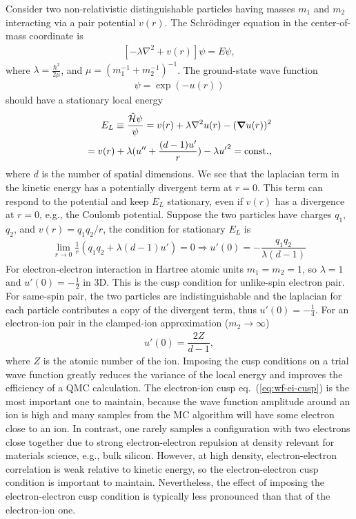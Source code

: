 Consider two non-relativistic distinguishable particles having masses $m_1$ and $m_2$ interacting via a pair potential $v(r)$. The Schr\"odinger equation in the center-of-mass coordinate is
\begin{align}
\left[-\lambda\nabla^2 + v(r)\right] \psi = E\psi,
\end{align}
where $\lambda=\frac{\hbar^2}{2\mu}$, and $\mu=(m_1^{-1}+m_2^{-1})^{-1}$. The ground-state wave function
\begin{align}
\psi = \exp(-u(r))
\end{align}
should have a stationary local energy
\begin{align} \label{eq:wf-cusp}
E_L \equiv \dfrac{\hat{\mathcal{H}}\psi}{\psi} = v(r) + \lambda\nabla^2u(r) - (\boldsymbol{\nabla}u(r))^2 \nonumber \\
= v(r) + \lambda (u''+\frac{(d-1)u'}{r}) - \lambda {u'}^2 = \text{const.},
\end{align}
where $d$ is the number of spatial dimensions.
We see that the laplacian term in the kinetic energy has a potentially divergent term at $r=0$.
This term can respond to the potential and keep $E_L$ stationary, even if $v(r)$ has a divergence at $r=0$, e.g., the Coulomb potential. Suppose the two particles have charges $q_1$, $q_2$, and $v(r)=q_1q_2/r$, the condition for stationary $E_L$ is
\begin{align}
\lim\limits_{r\rightarrow 0}\frac{1}{r} (q_1q_2+ \lambda (d-1) u')=0 \Rightarrow u'(0) = -\dfrac{q_1q_2}{\lambda (d-1)}
\end{align}
For electron-electron interaction in Hartree atomic units $m_1=m_2=1$, so $\lambda=1$ and $u'(0)=-\frac{1}{2}$ in 3D. This is the cusp condition for unlike-spin electron pair. For same-spin pair, the two particles are indistinguishable and the laplacian for each particle contributes a copy of the divergent term, thus $u'(0)=-\frac{1}{4}$. For an electron-ion pair in the clamped-ion approximation ($m_2\rightarrow\infty$)
\begin{align} \label{eq:wf-ei-cusp}
u'(0) = \dfrac{2Z}{d-1},
\end{align}
where $Z$ is the atomic number of the ion. Imposing the cusp conditions on a trial wave function greatly reduces the variance of the local energy and improves the efficiency of a QMC calculation. The electron-ion cusp eq.~(\ref{eq:wf-ei-cusp}) is the most important one to maintain, because the wave function amplitude around an ion is high and many samples from the MC algorithm will have some electron close to an ion. In contrast, one rarely samples a configuration with two electrons close together due to strong electron-electron repulsion at density relevant for materials science, e.g., bulk silicon. However, at high density, electron-electron correlation is weak relative to kinetic energy, so the electron-electron cusp condition is important to maintain. Nevertheless, the effect of imposing the electron-electron cusp condition is typically less pronounced than that of the electron-ion one.

